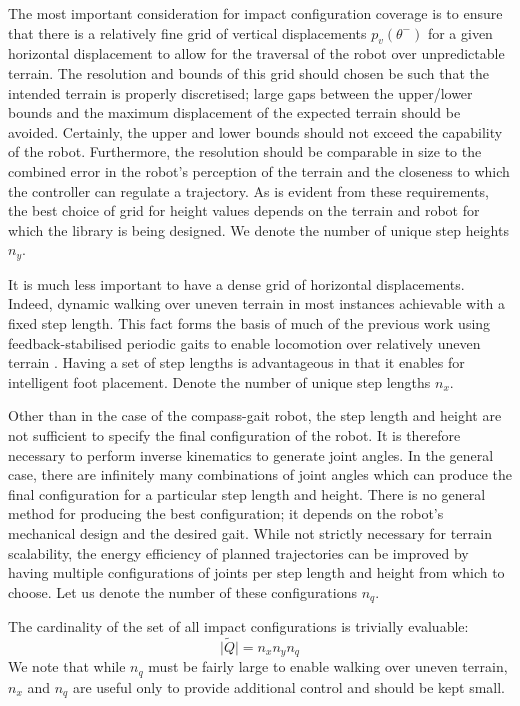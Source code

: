 The most important consideration for impact configuration coverage is to ensure that there is a relatively fine grid of vertical displacements $p_v(\theta^-)$ for a given horizontal displacement to allow for the traversal of the robot over unpredictable terrain. The resolution and bounds of this grid should chosen be such that the intended terrain is properly discretised; large gaps between the upper/lower bounds and the maximum displacement of the expected terrain should be avoided. Certainly, the upper and lower bounds should not exceed the capability of the robot. Furthermore, the resolution should be comparable in size to the combined error in the robot's perception of the terrain and the closeness to which the controller can regulate a trajectory. As is evident from these requirements, the best choice of grid for height values depends on the terrain and robot for which the library is being designed. We denote the number of unique step heights $n_y$.

It is much less important to have a dense grid of horizontal displacements. Indeed, dynamic walking over uneven terrain in most instances achievable with a fixed step length. This fact forms the basis of much of the previous work using feedback-stabilised periodic gaits to enable locomotion over relatively uneven terrain \cite{bigdog?}. Having a set of step lengths is advantageous in that it enables for intelligent foot placement. Denote the number of unique step lengths $n_x$.

Other than in the case of the compass-gait robot, the step length and height are not sufficient to specify the final configuration of the robot. It is therefore necessary to perform inverse kinematics to generate joint angles. In the general case, there are infinitely many combinations of joint angles which can produce the final configuration for a particular step length and height. There is no general method for producing the best configuration; it depends on the robot's mechanical design and the desired gait. While not strictly necessary for terrain scalability, the energy efficiency of planned trajectories can be improved by having multiple configurations of joints per step length and height from which to choose. Let us denote the number of these configurations $n_q$.

The cardinality of the set of all impact configurations is trivially evaluable:
\begin{equation} \label{eqn:numimpactconfs}
\lvert\tilde{Q}\rvert = n_xn_yn_q
\end{equation}
We note that while $n_q$ must be fairly large to enable walking over uneven terrain, $n_x$ and $n_q$ are useful only to provide additional control and should be kept small.

